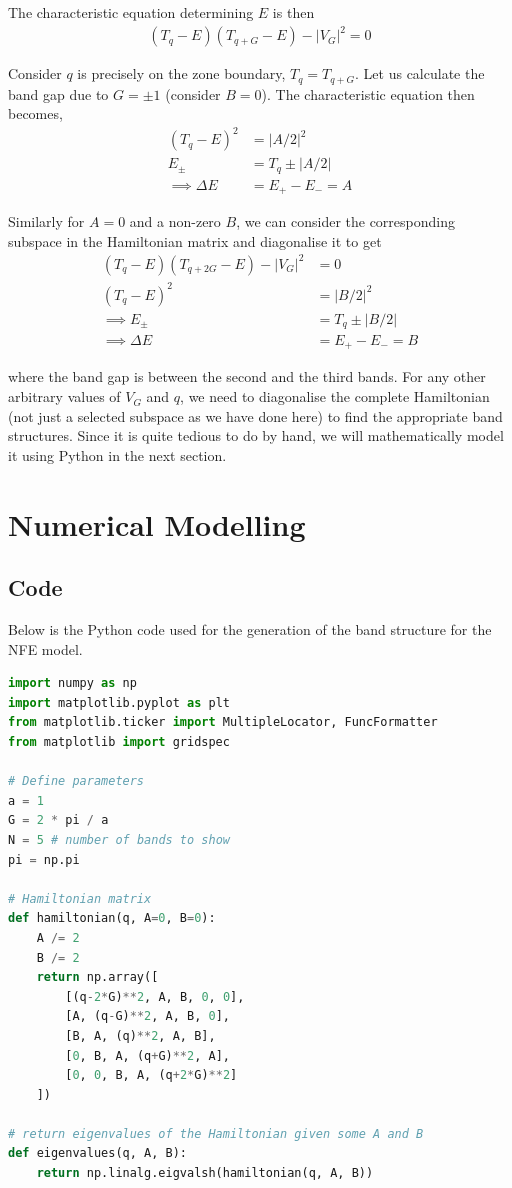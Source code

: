 \documentclass[12pt,a4paper]{article}
\begin{document}
The characteristic equation determining $E$ is then
\begin{align*}
    \left(T_q - E\right)\left(T_{q+G}-E\right) - |V_G|^2 = 0
\end{align*}

Consider $q$ is precisely on the zone boundary, $T_q = T_{q+G}$. Let us calculate the band gap due to $G=\pm 1$ (consider $B=0$). The characteristic equation then becomes,
\begin{align*}
    \left(T_q - E\right)^2 &= |A/2|^2 \\
    E_{\pm} &= T_q \pm |A/2|\\
    \implies \Delta E &= E_{+} - E_{-} = A
\end{align*}

Similarly for $A=0$ and a non-zero $B$, we can consider the corresponding subspace in the Hamiltonian matrix and diagonalise it to get
\begin{align*}
    \left(T_q - E\right) \left(T_{q+2G}-E \right) - |V_G|^2 &= 0\\
    \left(T_q - E\right) ^2 &= |B/2|^2 \\
    \implies E_{\pm} &= T_q \pm |B/2|\\
    \implies \Delta E &= E_{+} - E_{-} = B
\end{align*}

where the band gap is between the second and the third bands. For any other arbitrary values of $V_G$ and $q$, we need to diagonalise the complete Hamiltonian (not just a selected subspace as we have done here) to find the appropriate band structures. Since it is quite tedious to do by hand, we will mathematically model it using Python in the next section.

\section{Numerical Modelling}

\subsection{Code}

Below is the Python code used for the generation of the band structure for the NFE model.

\begin{lstlisting}[language=Python, caption=Defining Parameters and the Hamiltonian]
import numpy as np
import matplotlib.pyplot as plt
from matplotlib.ticker import MultipleLocator, FuncFormatter
from matplotlib import gridspec

# Define parameters
a = 1
G = 2 * pi / a
N = 5 # number of bands to show
pi = np.pi

# Hamiltonian matrix
def hamiltonian(q, A=0, B=0):
    A /= 2
    B /= 2
    return np.array([
        [(q-2*G)**2, A, B, 0, 0],
        [A, (q-G)**2, A, B, 0],
        [B, A, (q)**2, A, B],
        [0, B, A, (q+G)**2, A],
        [0, 0, B, A, (q+2*G)**2]
    ])

# return eigenvalues of the Hamiltonian given some A and B
def eigenvalues(q, A, B):
    return np.linalg.eigvalsh(hamiltonian(q, A, B))
\end{lstlisting}
\end{document}
